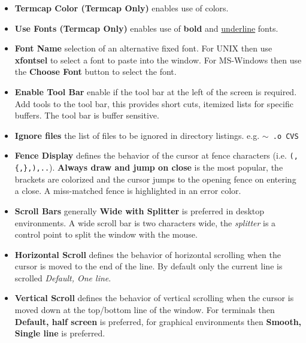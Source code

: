 \documentclass[11pt,a4paper,pdftex]{article}
\begin{document}
\begin{itemize}
    \begin{itemize}

      \item \textbf{Termcap Color (Termcap Only)} enables use of colors.

      \item \textbf{Use Fonts (Termcap Only)} enables use of \textbf{bold} and
      \underline{underline} fonts.

      \item \textbf{Font Name} selection of an alternative fixed font. For
      UNIX then use \textbf{xfontsel} to select a font to paste into the
      window. For MS-Windows then use the \textbf{Choose Font} button to
      select the font.

      \item \textbf{Enable Tool Bar} enable if the tool bar at the left of the
      screen is required. Add tools to the tool bar, this provides short cuts,
      itemized lists for specific buffers. The tool bar is buffer sensitive.

      \item \textbf{Ignore files} the list of files to be ignored in directory
      listings. e.g. \texttt{$\sim$ .o CVS}

      \item \textbf{Fence Display} defines the behavior of the cursor at fence
      characters (i.e. \texttt{(,\{,\},),..}). \textbf{Always draw and jump on
      close} is the most popular, the brackets are colorized and the cursor
      jumps to the opening fence on entering a close. A miss-matched fence is
      highlighted in an error color.

      \item \textbf{Scroll Bars} generally \textbf{Wide with Splitter} is
      preferred in desktop environments. A wide scroll bar is two characters
      wide, the \textit{splitter} is a control point to split the window with
      the mouse.

      \item \textbf{Horizontal Scroll} defines the behavior of horizontal
      scrolling when the cursor is moved to the end of the line. By default
      only the current line is scrolled \textit{Default, One line}.

      \item \textbf{Vertical Scroll} defines the behavior of vertical
      scrolling when the cursor is moved down at the top/bottom line of the
      window. For terminals then \textbf{Default, half screen} is preferred,
      for graphical environments then \textbf{Smooth, Single line} is
      preferred.


\end{itemize}
\end{itemize}
\end{document}
